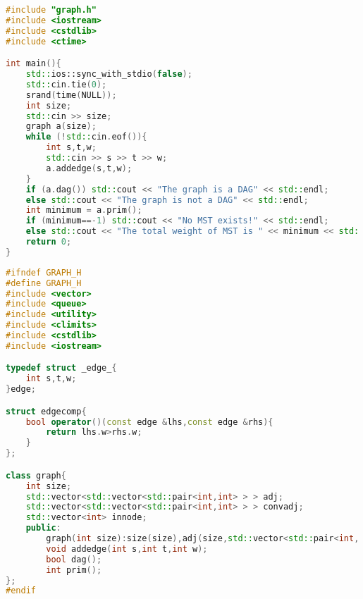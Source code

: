 \documentclass{article}
\begin{document}
\begin{lstlisting}[title=main.cpp,language=C++]
#include "graph.h"
#include <iostream>
#include <cstdlib>
#include <ctime>

int main(){
    std::ios::sync_with_stdio(false);
    std::cin.tie(0);
    srand(time(NULL));
    int size;
    std::cin >> size;
    graph a(size);
    while (!std::cin.eof()){
        int s,t,w;
        std::cin >> s >> t >> w;
        a.addedge(s,t,w);
    }
    if (a.dag()) std::cout << "The graph is a DAG" << std::endl;
    else std::cout << "The graph is not a DAG" << std::endl;
    int minimum = a.prim();
    if (minimum==-1) std::cout << "No MST exists!" << std::endl;
    else std::cout << "The total weight of MST is " << minimum << std::endl;
    return 0;
}
\end{lstlisting}
\begin{lstlisting}[title=graph.h,language=C++]
#ifndef GRAPH_H
#define GRAPH_H
#include <vector>
#include <queue>
#include <utility>
#include <climits>
#include <cstdlib>
#include <iostream>

typedef struct _edge_{
    int s,t,w;
}edge;

struct edgecomp{
    bool operator()(const edge &lhs,const edge &rhs){
        return lhs.w>rhs.w;
    }
};

class graph{
    int size;
    std::vector<std::vector<std::pair<int,int> > > adj;
    std::vector<std::vector<std::pair<int,int> > > convadj;
    std::vector<int> innode;
    public:
        graph(int size):size(size),adj(size,std::vector<std::pair<int, int> >()),convadj(size,std::vector<std::pair<int, int> >()),innode(size,0){}  
        void addedge(int s,int t,int w);
        bool dag();
        int prim();
};
#endif
\end{lstlisting}
\end{document}
